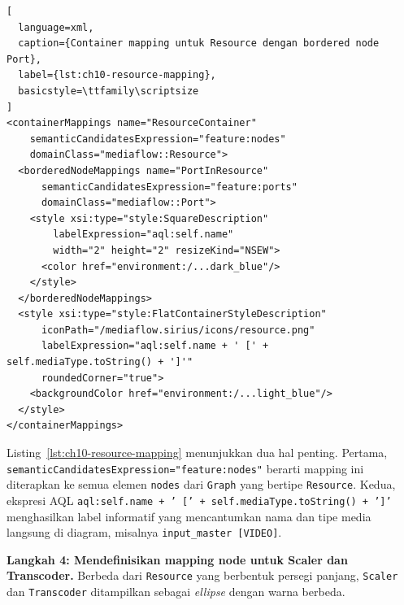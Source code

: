 \begin{lstlisting}[
  language=xml,
  caption={Container mapping untuk Resource dengan bordered node Port},
  label={lst:ch10-resource-mapping},
  basicstyle=\ttfamily\scriptsize
]
<containerMappings name="ResourceContainer"
    semanticCandidatesExpression="feature:nodes"
    domainClass="mediaflow::Resource">
  <borderedNodeMappings name="PortInResource"
      semanticCandidatesExpression="feature:ports"
      domainClass="mediaflow::Port">
    <style xsi:type="style:SquareDescription"
        labelExpression="aql:self.name"
        width="2" height="2" resizeKind="NSEW">
      <color href="environment:/...dark_blue"/>
    </style>
  </borderedNodeMappings>
  <style xsi:type="style:FlatContainerStyleDescription"
      iconPath="/mediaflow.sirius/icons/resource.png"
      labelExpression="aql:self.name + ' [' + self.mediaType.toString() + ']'"
      roundedCorner="true">
    <backgroundColor href="environment:/...light_blue"/>
  </style>
</containerMappings>
\end{lstlisting}

\noindent Listing~\ref{lst:ch10-resource-mapping} menunjukkan dua hal penting. Pertama, \texttt{semanticCandidatesExpression="feature:nodes"} berarti mapping ini diterapkan ke semua elemen \texttt{nodes} dari \texttt{Graph} yang bertipe \texttt{Resource}. Kedua, ekspresi AQL \texttt{aql:self.name + ' [' + self.mediaType.toString() + ']'} menghasilkan label informatif yang mencantumkan nama dan tipe media langsung di diagram, misalnya \texttt{input\_master [VIDEO]}.

\textbf{Langkah 4: Mendefinisikan mapping node untuk Scaler dan Transcoder.} Berbeda dari \texttt{Resource} yang berbentuk persegi panjang, \texttt{Scaler} dan \texttt{Transcoder} ditampilkan sebagai \textit{ellipse} dengan warna berbeda.


